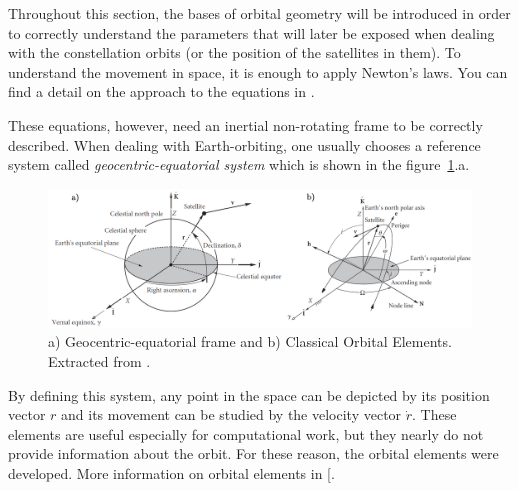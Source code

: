 Throughout this section, the bases of orbital geometry will be introduced in order to correctly understand the parameters that will later be exposed when dealing with the constellation orbits (or the position of the satellites in them). To understand the movement in space, it is enough to apply Newton's laws. You can find a detail on the approach to the equations in \cite[Chapter 1, Section 2]{annex1}.

These equations, however, need an inertial non-rotating frame to be correctly described. When dealing with Earth-orbiting, one usually chooses a reference system called \textit{geocentric-equatorial system} which is shown in the figure~\ref{fig:eqframe}.a. 

\begin{figure}[H]
\centering
\includegraphics[scale=.28]{./Geometry/fig-Ch1-Geometry/COE&eqframe.png}
\caption[a) Geocentric-equatorial frame and b) Classical Orbital Elements]{a) Geocentric-equatorial frame and b) Classical Orbital Elements. Extracted from \cite{Howard}.}
\label{fig:eqframe}
\end{figure}

By defining this system, any point in the space can be depicted by its position vector $r$ and its movement can be studied by the velocity vector $\dot{r}$. These elements are useful especially for computational work, but they nearly do not provide information about the orbit. For these reason, the orbital elements were developed. More information on orbital elements in [\cite[Chapter 1, Section 1]{annex1}.